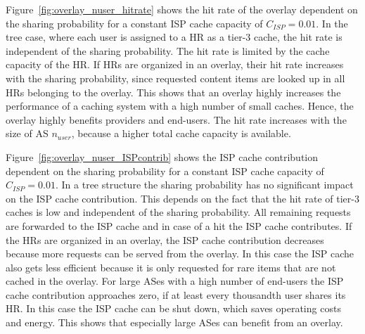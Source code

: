 Figure~\ref{fig:overlay_nuser_hitrate} shows the hit rate of the overlay dependent on the sharing probability for a constant ISP cache capacity of $C_{ISP}=0.01$. In the tree case, where each user is assigned to a HR as a tier-3 cache, the hit rate is independent of the sharing probability. The hit rate is limited by the cache capacity of the HR. If HRs are organized in an overlay, their hit rate increases with the sharing probability, since requested content items are looked up in all HRs belonging to the overlay. This shows that an overlay highly increases the performance of a caching system with a high number of small caches. Hence, the overlay highly benefits providers and end-users. The hit rate increases with the size of AS $n_{user}$, because a higher total cache capacity is available.




Figure~\ref{fig:overlay_nuser_ISPcontrib} shows the ISP cache contribution dependent on the sharing probability for a constant ISP cache capacity of $C_{ISP}=0.01$. In a tree structure the sharing probability has no significant impact on the ISP cache contribution. This depends on the fact that the hit rate of tier-3 caches is low and independent of the sharing probability. All remaining requests are forwarded to the ISP cache and in case of a hit the ISP cache contributes. If the HRs are organized in an overlay, the ISP cache contribution decreases because more requests can be served from the overlay. In this case the ISP cache also gets less efficient because it is only requested for rare items that are not cached in the overlay.
For large ASes with a high number of end-users the ISP cache contribution approaches zero, if at least every thousandth user shares its HR. In this case the ISP cache can be shut down, which saves operating costs and energy. This shows that especially large ASes can benefit from an overlay.

